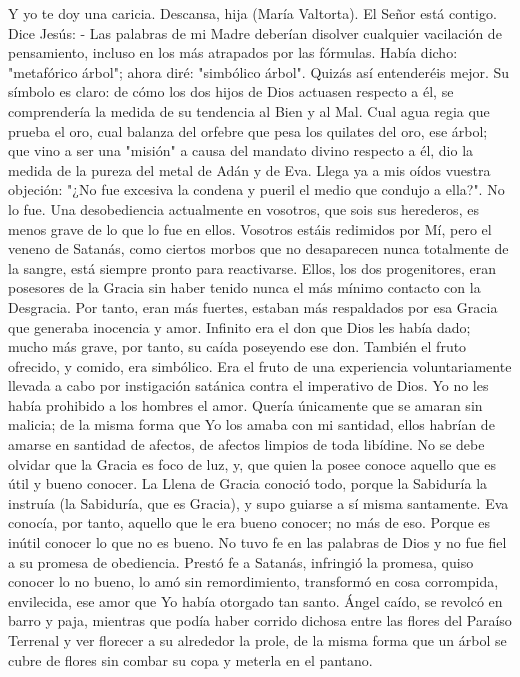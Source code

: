 \documentclass[12pt]{book} %
\begin{document}
Y yo te doy una caricia. Descansa, hija (María Valtorta). El Señor está contigo. 
Dice Jesús: 
- Las palabras de mi Madre deberían disolver cualquier vacilación de pensamiento, incluso en los más atrapados por las 
fórmulas. 
Había dicho: "metafórico árbol"; ahora diré: "simbólico árbol". Quizás así entenderéis mejor. Su símbolo es claro: de 
cómo los dos hijos de Dios actuasen respecto a él, se comprendería la medida de su tendencia al Bien y al Mal. Cual agua regia que prueba el oro, cual balanza del orfebre que pesa los quilates del oro, ese árbol; que vino a ser una "misión" a causa del mandato divino respecto a él, dio la medida de la pureza del metal de Adán y de Eva. 
Llega ya a mis oídos vuestra objeción: "¿No fue excesiva la condena y pueril el medio que condujo a ella?". 
No lo fue. Una desobediencia actualmente en vosotros, que sois sus herederos, es menos grave de lo que lo fue en ellos. Vosotros estáis redimidos por Mí, pero el veneno de Satanás, como ciertos morbos que no desaparecen nunca totalmente de la sangre, está siempre pronto para reactivarse. Ellos, los dos progenitores, eran posesores de la Gracia sin haber tenido nunca el más mínimo contacto con la Desgracia. Por tanto, eran más fuertes, estaban más respaldados por esa Gracia que generaba inocencia y amor. Infinito era el don que Dios les había dado; mucho más grave, por tanto, su caída poseyendo ese don. 
También el fruto ofrecido, y comido, era simbólico. Era el fruto de una experiencia voluntariamente llevada a cabo por instigación satánica contra el imperativo de Dios. Yo no les había prohibido a los hombres el amor. Quería únicamente que se amaran sin malicia; de la misma forma que Yo los amaba con mi santidad, ellos habrían de amarse en santidad de afectos, de afectos limpios de toda libídine. 
No se debe olvidar que la Gracia es foco de luz, y, que quien la posee conoce aquello que es útil y bueno conocer. La Llena de Gracia conoció todo, porque la Sabiduría la instruía (la Sabiduría, que es Gracia), y supo guiarse a sí misma santamente. Eva conocía, por tanto, aquello que le era bueno conocer; no más de eso. Porque es inútil conocer lo que no es bueno. No tuvo fe en las palabras de Dios y no fue fiel a su promesa de obediencia. Prestó fe a Satanás, infringió la promesa, quiso conocer lo no bueno, lo amó sin remordimiento,  transformó en cosa corrompida, envilecida, ese amor que Yo había otorgado tan santo. Ángel caído, se revolcó en barro y paja, mientras que podía haber corrido dichosa entre las flores del Paraíso Terrenal y ver florecer a su alrededor la prole, de la misma forma que un árbol se cubre de flores sin combar su copa y meterla en el pantano. 
\end{document}
